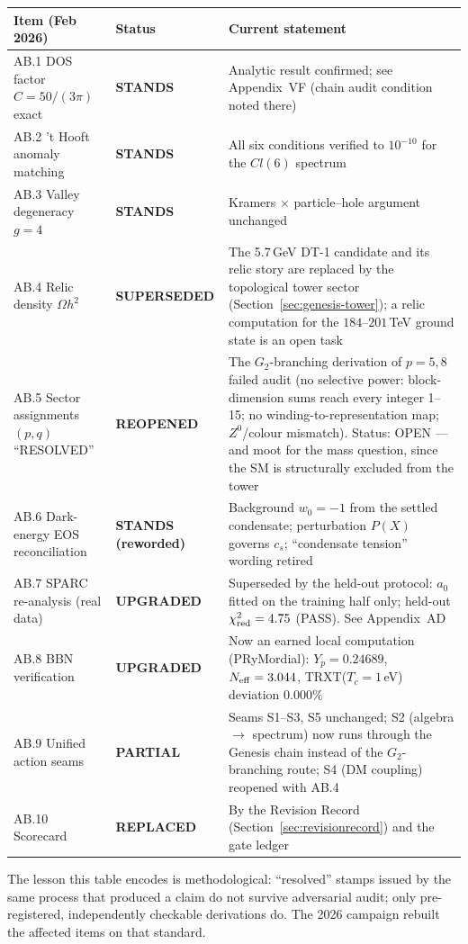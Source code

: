 \begin{center}
\begin{tabular}{p{} p{} p{}}
\toprule
\textbf{Item (Feb 2026)} & \textbf{Status} & \textbf{Current statement} \\
\midrule
AB.1 DOS factor $C=50/(3\pi)$ exact & \textbf{STANDS} & Analytic result confirmed; see Appendix~VF (chain audit condition noted there) \\
AB.2 't Hooft anomaly matching & \textbf{STANDS} & All six conditions verified to $10^{-10}$ for the $Cl(6)$ spectrum \\
AB.3 Valley degeneracy $g=4$ & \textbf{STANDS} & Kramers $\times$ particle--hole argument unchanged \\
AB.4 Relic density $\Omega h^2$ & \textbf{SUPERSEDED} & The 5.7\,GeV DT-1 candidate and its relic story are replaced by the topological tower sector (Section~\ref{sec:genesis-tower}); a relic computation for the $184$--$201$\,TeV ground state is an open task \\
AB.5 Sector assignments $(p,q)$ ``RESOLVED'' & \textbf{REOPENED} & The $G_2$-branching derivation of $p=5,8$ failed audit (no selective power: block-dimension sums reach every integer 1--15; no winding-to-representation map; $Z^0$/colour mismatch). Status: OPEN --- and moot for the mass question, since the SM is structurally excluded from the tower \\
AB.6 Dark-energy EOS reconciliation & \textbf{STANDS (reworded)} & Background $w_0=-1$ from the settled condensate; perturbation $P(X)$ governs $c_s$; ``condensate tension'' wording retired \\
AB.7 SPARC re-analysis (real data) & \textbf{UPGRADED} & Superseded by the held-out protocol: $a_0$ fitted on the training half only; held-out $\chi^2_{\rm red}=4.75$ (PASS). See Appendix~AD \\
AB.8 BBN verification & \textbf{UPGRADED} & Now an earned local computation (PRyMordial): $Y_p=0.24689$, $N_{\rm eff}=3.044$, TRXT($T_c=1$\,eV) deviation $0.000\%$ \\
AB.9 Unified action seams & \textbf{PARTIAL} & Seams S1--S3, S5 unchanged; S2 (algebra $\to$ spectrum) now runs through the Genesis chain instead of the $G_2$-branching route; S4 (DM coupling) reopened with AB.4 \\
AB.10 Scorecard & \textbf{REPLACED} & By the Revision Record (Section~\ref{sec:revisionrecord}) and the gate ledger \\
\bottomrule
\end{tabular}
\end{center}

\noindent The lesson this table encodes is methodological: ``resolved'' stamps issued by the
same process that produced a claim do not survive adversarial audit; only pre-registered,
independently checkable derivations do. The 2026 campaign rebuilt the affected items on that
standard.
